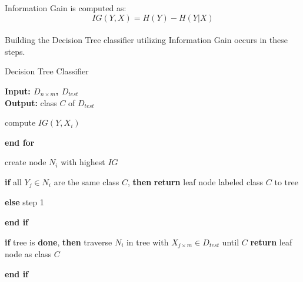 \documentclass{article}
\begin{document}
Information Gain is computed as:
\begin{equation}
    IG (Y, X) = H(Y) - H(Y|X)
\end{equation}\\

\break
Building the Decision Tree classifier utilizing Information Gain occurs in these steps.

\begin{algorithm}
\caption{Decision Tree Classifier}
\textbf{Input: $D_{n \times m}$, $D_{test}$}\\
\textbf{Output:} class $C$ of $D_{test}$
\begin{algorithmic}[1]
        \STATE compute $IG(Y, X_i)$
    \item \textbf{end for}
    \item create node $N_i$ with highest $IG$
    \item \textbf{if} all $Y_j \in N_i$ are the same class $C$, \textbf{then}
        \STATE \textbf{return} leaf node labeled class $C$ to tree
    \item \textbf{else} step 1
    \item \textbf{end if}
    \item \textbf{if} tree is \textbf{done}, \textbf{then}
        \STATE traverse $N_i$ in tree with $X_{j \times m} \in D_{test}$ until $C$
        \STATE \textbf{return} leaf node as class $C$
    \item \textbf{end if}
    
\end{algorithmic}
\end{algorithm}
\end{document}
